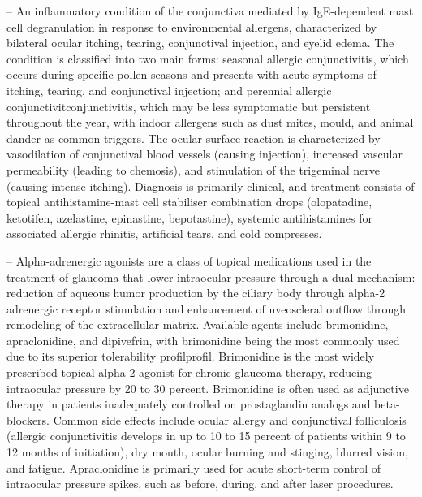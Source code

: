 -- An inflammatory condition of the conjunctiva mediated by IgE-dependent mast cell degranulation in response to environmental allergens, characterized by bilateral ocular itching, tearing, conjunctival injection, and eyelid edema. The condition is classified into two main forms: seasonal allergic conjunctivitis, which occurs during specific pollen seasons and presents with acute symptoms of itching, tearing, and conjunctival injection; and perennial allergic conjunctivitconjunctivitis, which may be less symptomatic but persistent throughout the year, with indoor allergens such as dust mites, mould, and animal dander as common triggers. The ocular surface reaction is characterized by vasodilation of conjunctival blood vessels (causing injection), increased vascular permeability (leading to chemosis), and stimulation of the trigeminal nerve (causing intense itching). Diagnosis is primarily clinical, and treatment consists of topical antihistamine-mast cell stabiliser combination drops (olopatadine, ketotifen, azelastine, epinastine, bepotastine), systemic antihistamines for associated allergic rhinitis, artificial tears, and cold compresses.

-- Alpha-adrenergic agonists are a class of topical medications used in the treatment of glaucoma that lower intraocular pressure through a dual mechanism: reduction of aqueous humor production by the ciliary body through alpha-2 adrenergic receptor stimulation and enhancement of uveoscleral outflow through remodeling of the extracellular matrix. Available agents include brimonidine, apraclonidine, and dipivefrin, with brimonidine being the most commonly used due to its superior tolerability profilprofil. Brimonidine is the most widely prescribed topical alpha-2 agonist for chronic glaucoma therapy, reducing intraocular pressure by 20 to 30 percent. Brimonidine is often used as adjunctive therapy in patients inadequately controlled on prostaglandin analogs and beta-blockers. Common side effects include ocular allergy and conjunctival folliculosis (allergic conjunctivitis develops in up to 10 to 15 percent of patients within 9 to 12 months of initiation), dry mouth, ocular burning and stinging, blurred vision, and fatigue. Apraclonidine is primarily used for acute short-term control of intraocular pressure spikes, such as before, during, and after laser procedures.

